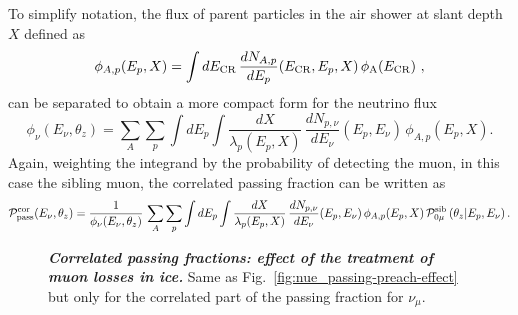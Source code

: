 To simplify notation, the flux of parent particles in the air shower at slant depth $X$ defined as
\begin{equation}
\label{eq:phip}
\phi_{A, p}(E_p, X) = \int dE_{\rm CR} \, \frac{dN_{A, p}}{dE_p}(E_{\rm CR}, E_p, X) \, \phi_{\rm A} (E_{\rm CR}) ~,
\end{equation}
can be separated to obtain a more compact form for the neutrino flux
\begin{equation}
\label{eq:nufluxcor}
\phi_\nu(E_\nu, \theta_z) = \sum_A \sum_{p} \int dE_p  \int \frac{dX}{\lambda_p(E_p, X)} \, \frac{dN_{p, \nu}}{dE_\nu}(E_p, E_\nu) \, \phi_{A, p}(E_p, X).
\end{equation}
Again, weighting the integrand by the probability of detecting the muon, in this case the sibling muon, the correlated passing fraction can be written as
\begin{equation}
\label{eq:Pcor}
{\cal P}_{\rm pass}^{\rm cor}(E_\nu, \theta_z) = \frac{1}{\phi_\nu(E_\nu, \theta_z)} \, \sum_A \sum_{p} \int dE_p \int \frac{dX}{\lambda_p(E_p, X)} \, \frac{dN_{p, \nu}}{dE_\nu}(E_p, E_\nu) \, \phi_{A, p}(E_p, X) \, {\cal P}_{0\mu}^{\rm sib} \left(\theta_z|E_p, E_\nu \right).
\end{equation}

\begin{figure}
	\centering
	\caption{\textbf{\textit{Correlated passing fractions: effect of the treatment of muon losses in ice.}} Same as Fig.~\ref{fig:nue_passing-preach-effect} but only for the correlated part of the passing fraction for $\nu_\mu$.}
	\label{fig:nu-mu-correlated-preach-effect}
\end{figure}

